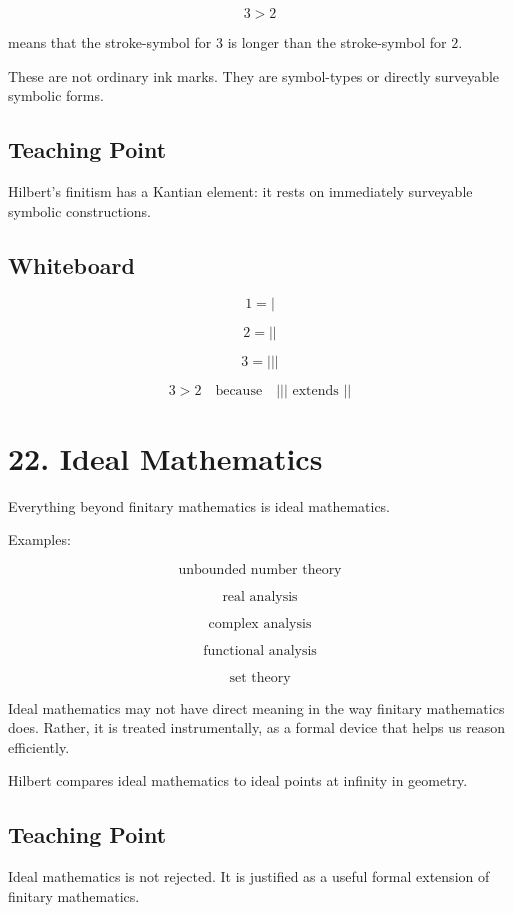 \documentclass[11pt]{article}
\begin{document}
\[
3>2
\]

means that the stroke-symbol for \(3\) is longer than the stroke-symbol for \(2\).

These are not ordinary ink marks. They are symbol-types or directly surveyable symbolic
forms.

\subsection*{Teaching Point}

Hilbert's finitism has a Kantian element: it rests on immediately surveyable symbolic
constructions.

\subsection*{Whiteboard}

\[
1 = |
\]

\[
2 = ||
\]

\[
3 = |||
\]

\[
3>2
\quad
\text{because}
\quad
||| \text{ extends } ||
\]

\section*{22. Ideal Mathematics}

Everything beyond finitary mathematics is ideal mathematics.

Examples:

\[
\text{unbounded number theory}
\]

\[
\text{real analysis}
\]

\[
\text{complex analysis}
\]

\[
\text{functional analysis}
\]

\[
\text{set theory}
\]

Ideal mathematics may not have direct meaning in the way finitary mathematics does.
Rather, it is treated instrumentally, as a formal device that helps us reason efficiently.

Hilbert compares ideal mathematics to ideal points at infinity in geometry.

\subsection*{Teaching Point}

Ideal mathematics is not rejected. It is justified as a useful formal extension of finitary
mathematics.
\end{document}
